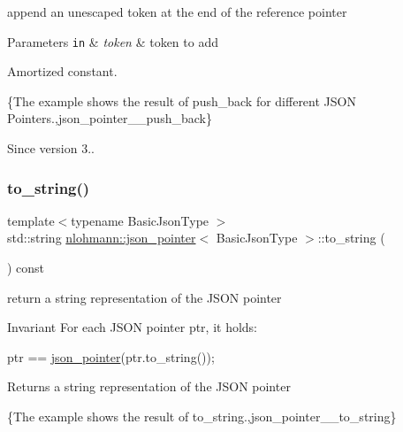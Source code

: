 append an unescaped token at the end of the reference pointer 


\begin{DoxyParams}[1]{Parameters}
\mbox{\tt in}  & {\em token} & token to add\\
\hline
\end{DoxyParams}
Amortized constant.

\{The example shows the result of {\ttfamily push\+\_\+back} for different J\+S\+ON Pointers.,json\+\_\+pointer\+\_\+\+\_\+push\+\_\+back\}

\begin{DoxySince}{Since}
version 3.. 
\end{DoxySince}
\mbox{\label{classnlohmann_1_1json__pointer_a3d4b15d32d096e3776c5d2c773b524f5}} 
\subsubsection{\texorpdfstring{to\+\_\+string()}{to\_string()}}
{\footnotesize\ttfamily template$<$typename Basic\+Json\+Type $>$ \\
std\+::string \mbox{\hyperlink{classnlohmann_1_1json__pointer}{nlohmann\+::json\+\_\+pointer}}$<$ Basic\+Json\+Type $>$\+::to\+\_\+string (\begin{DoxyParamCaption}{ }\end{DoxyParamCaption}) const\hspace{0.3cm}{\ttfamily [inline]}}



return a string representation of the J\+S\+ON pointer 

\begin{DoxyInvariant}{Invariant}
For each J\+S\+ON pointer {\ttfamily ptr}, it holds\+: 
\begin{DoxyCode}
ptr == \mbox{\hyperlink{classnlohmann_1_1json__pointer_a7f32d7c62841f0c4a6784cf741a6e4f8}{json\_pointer}}(ptr.to\_string());
\end{DoxyCode}

\end{DoxyInvariant}
\begin{DoxyReturn}{Returns}
a string representation of the J\+S\+ON pointer
\end{DoxyReturn}
\{The example shows the result of {\ttfamily to\+\_\+string}.,json\+\_\+pointer\+\_\+\+\_\+to\+\_\+string\}

